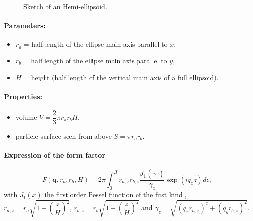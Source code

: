 \begin{figure}[ht]
\hfill
{}
\hfill
{}
\hfill
\caption{Sketch of an Hemi-ellipsoid.}
\label{fig:hemiellipsoid}
\end{figure}

\paragraph{Parameters:}
\begin{itemize}
\item $r_a$ = half length of the ellipse main axis parallel to $x$,
\item$r_b$ = half length of the ellipse main axis parallel to $y$, 
\item $H$ = height (half length of the vertical main axis of a full ellipsoid).
\end{itemize}

\paragraph{Properties:}
\begin{itemize}
\item volume $V = \dfrac{2}{3}\pi r_a r_bH$,
\item particle surface seen from above $S =\pi r_a r_b$.
\end{itemize}

\paragraph{Expression of the form factor}
\begin{equation*}
F(\mathbf{q},r_a,r_b,H) = 2\pi \int_0 ^{H} r_{a,z} r_{b,z}
\frac{J_1(\gamma_z)}{\gamma_z}\exp(iq_z z)dz,
\end{equation*}
with $J_1(x)$ the first order
Bessel function of the first kind \cite{AbSt64}, $r_{a,z} = r_a \sqrt{1-\left(\dfrac{z}{H} \right)^2}$, ${r_{b,z} = r_b
\sqrt{1-\left(\dfrac{z}{H} \right)^2}}$ and $\gamma_z =\sqrt{(q_x r_{a,z})^2+(q_y r_{b,z})^2}$.

